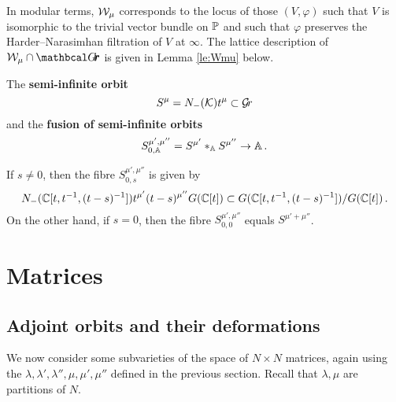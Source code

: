 \documentclass[draft]{article}
\begin{document}
In modular terms, $\cW_\mu$ corresponds to the locus of those $ (V, \varphi)$ such that $ V $ is isomorphic to the trivial vector bundle on $ \PP$ and such that $ \varphi$ preserves the {Harder--Narasimhan filtration of $V$ at $ \infty$}. The lattice description of $ \cW_\mu \cap \Grth$ is given in Lemma \ref{le:Wmu} below. 
% 
% 
\begin{definition} 
\label{def:inftyorbits}
    The \textbf{semi-infinite orbit} 
$$ S^\mu = N_-(\cK)t^\mu \subset \Gr $$ 
and the \textbf{fusion of  semi-infinite orbits} 
$$ 
    S^{\mu', \mu''}_{0,\AA} = S^{\mu'} \ast_\AA S^{\mu''} \to \AA \,.
$$  
\end{definition}
If $ s \ne 0 $, then the fibre $S^{\mu', \mu''}_{0,s} $ is given by
$$
    N_-(\CC[t, t^{-1}, (t-s)^{-1}])t^{\mu'} (t-s)^{\mu''} G(\CC[t])\subset G(\CC[t,t^{-1}, (t-s)^{-1}]) / G(\CC[t]) \,. %
$$
On the other hand, if $ s = 0$, then the fibre $S^{\mu', \mu''}_{0,0} $ equals $ S^{\mu' + \mu''}$. 
% 

\section{Matrices}
\label{s:mats}
% 
\subsection{Adjoint orbits and their deformations}
\label{ss:familiesofadjointorbits}
% 
We now consider some subvarieties of the space of $ N\times N$ matrices, again using the $ \lambda, \lambda', \lambda'', \mu, \mu', \mu''$ defined in the previous section.  Recall that $\lambda, \mu $ are partitions of $ N$.
\end{document}
